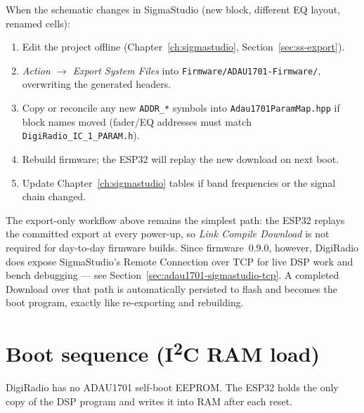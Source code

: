 When the schematic changes in SigmaStudio (new block, different EQ layout,
renamed cells):

\begin{enumerate}
  \item Edit the project offline (Chapter~\ref{ch:sigmastudio},
        Section~\ref{sec:ss-export}).
  \item \emph{Action $\rightarrow$ Export System Files} into
        \texttt{Firmware/ADAU1701-Firmware/}, overwriting the generated headers.
  \item Copy or reconcile any new \texttt{ADDR\_*} symbols into
        \texttt{Adau1701ParamMap.hpp} if block names moved (fader/EQ addresses
        must match \texttt{DigiRadio\_IC\_1\_PARAM.h}).
  \item Rebuild firmware; the ESP32 will replay the new download on next boot.
  \item Update Chapter~\ref{ch:sigmastudio} tables if band frequencies or the
        signal chain changed.
\end{enumerate}

\begin{drnote}
The export-only workflow above remains the simplest path: the ESP32 replays
the committed export at every power-up, so \emph{Link Compile Download} is
not required for day-to-day firmware builds. Since firmware~0.9.0, however,
DigiRadio does expose SigmaStudio's Remote Connection over TCP for live DSP
work and bench debugging --- see Section~\ref{sec:adau1701-sigmastudio-tcp}.
A completed Download over that path is automatically persisted to flash and
becomes the boot program, exactly like re-exporting and rebuilding.
\end{drnote}

\section{Boot sequence (I\textsuperscript{2}C RAM load)}
\label{sec:adau1701-boot}

DigiRadio has no ADAU1701 self-boot EEPROM. The ESP32 holds the only copy of
the DSP program and writes it into RAM after each reset.

